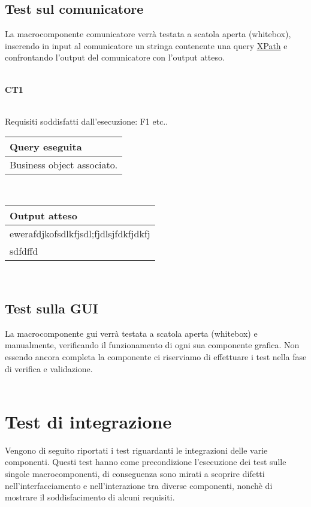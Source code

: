 \subsection{Test sul comunicatore}
La macrocomponente comunicatore verr\`a testata a scatola aperta (whitebox), inserendo in input al comunicatore un stringa contenente una query \underline{XPath} e confrontando l'output del comunicatore con l'output atteso.\\
\\
\begin{Large}\textbf{CT1}\end{Large} \\
Requisiti soddisfatti dall'esecuzione: F1 etc..
\begin{center}
\begin{tabular}{|p{11cm}|} \hline
\textbf{Query eseguita}\\ \hline
Business object associato.\\ \hline
\end{tabular} \\
\end{center}
\begin{center}
\begin{tabular}{|p{11cm}|} \hline
\textbf{Output atteso}\\ \hline
ewerafdjkofsdlkfjsdl;fjdlsjfdkfjdkfj\\
sdfdffd\\
 \hline
\end{tabular} \\
\end{center}

\subsection{Test sulla GUI}
La macrocomponente gui verr\`a testata a scatola aperta (whitebox) e manualmente, verificando il funzionamento di ogni sua componente grafica. Non essendo ancora completa la componente ci riserviamo di effettuare i test nella fase di verifica e validazione.\\
\\

\section{Test di integrazione}
Vengono di seguito riportati i test riguardanti le integrazioni delle varie componenti. Questi test hanno come precondizione l'esecuzione dei test sulle singole macrocomponenti, di conseguenza sono mirati a scoprire difetti nell'interfacciamento e nell'interazione tra diverse componenti, nonch\`e di mostrare il soddisfacimento di alcuni requisiti.

